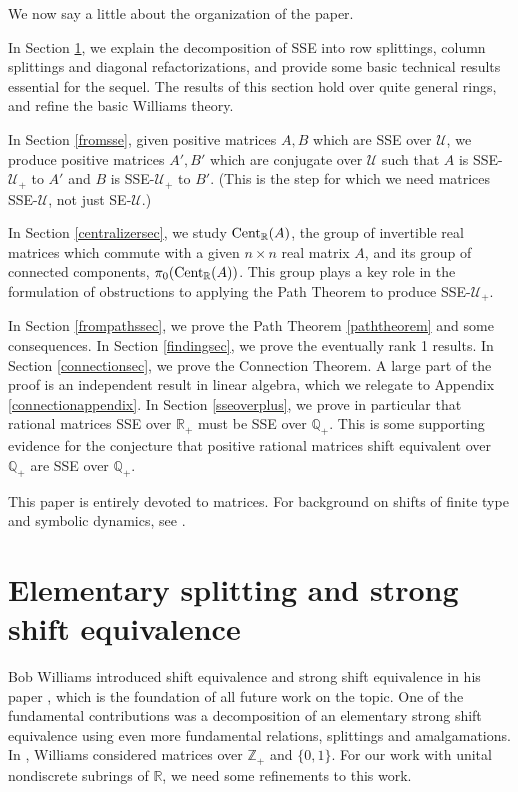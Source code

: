 \documentclass{amsart}
\theoremstyle{definition}
\theoremstyle{remark}
\numberwithin{equation}{section}
\begin{document}
We now say a little about the organization 
 of the paper.  

In Section \ref{elemsec}, we explain the decomposition 
of SSE into row splittings, column splittings and 
diagonal refactorizations, and provide 
some basic  technical results  
essential for the sequel. The results of this section 
hold over quite general rings, and refine the basic 
Williams theory. 
 
In Section \ref{fromsse}, given  positive matrices 
$A,B$ which are SSE over $\mathcal U$, we 
produce positive matrices $A',B'$ which are conjugate 
over $\mathcal U$ such that 
$A$ is SSE-$\mathcal U_+$ to $A'$ and 
$B$ is SSE-$\mathcal U_+$ to $B'$. 
(This is the step for which we need matrices 
SSE-$\mathcal U$, not just SE-$\mathcal U$.) 

In Section \ref{centralizersec}, we study 
$\textnormal{Cent}_{\mathbb R}(A)$, the group of invertible 
real matrices which commute with a given $n\times n$ real 
matrix $A$, and its group of connected components, 
$\pi_0( \textnormal{Cent}_{\mathbb R}(A) )$.  
This group plays a key role in the formulation of 
obstructions to applying the Path Theorem 
to produce SSE-$\mathcal U_+$. 

In Section \ref{frompathssec}, we prove the Path Theorem \ref{paththeorem} 
and some consequences. In Section \ref{findingsec}, we prove the 
eventually rank 1 results. 
In Section \ref{connectionsec}, we prove the Connection Theorem. 
A large part of the proof is an independent result in linear 
algebra, which we relegate to Appendix \ref{connectionappendix}. 
In Section \ref{sseoverplus}, we 
prove in particular that rational matrices SSE over $\mathbb R_+$ 
must be SSE over $\mathbb Q_+$. This is some supporting evidence 
for the conjecture \cite[Conj. 5.1]{B}
that positive rational matrices 
shift equivalent over $\mathbb Q_+$ are SSE over $\mathbb Q_+$. 

This paper is  entirely devoted to matrices. 
For background on shifts of finite type and symbolic dynamics, 
see \cite{Ki,LM}. 

\section{Elementary splitting and strong shift equivalence }\label{elemsec}

Bob Williams introduced shift equivalence and strong shift equivalence
in his  paper \cite{Wi}, which is the foundation of all 
future work on the topic. One of the fundamental contributions was 
a decomposition of an elementary strong shift equivalence using 
even more fundamental relations, splittings and amalgamations. 
 In \cite{Wi}, 
 Williams considered 
matrices over $\mathbb Z_+$ and $\{0,1\}$.  For our work with 
unital nondiscrete subrings of $\mathbb R$, we need  some 
refinements to this work.
\end{document}
